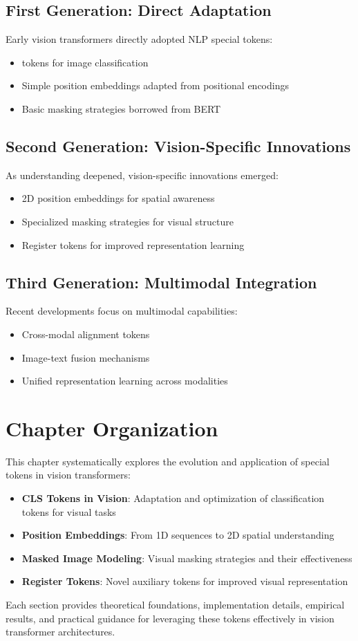 \subsection{First Generation: Direct Adaptation}
Early vision transformers directly adopted NLP special tokens:
\begin{itemize}
\item \cls{} tokens for image classification
\item Simple position embeddings adapted from positional encodings
\item Basic masking strategies borrowed from BERT
\end{itemize}

\subsection{Second Generation: Vision-Specific Innovations}
As understanding deepened, vision-specific innovations emerged:
\begin{itemize}
\item 2D position embeddings for spatial awareness
\item Specialized masking strategies for visual structure
\item Register tokens for improved representation learning
\end{itemize}

\subsection{Third Generation: Multimodal Integration}
Recent developments focus on multimodal capabilities:
\begin{itemize}
\item Cross-modal alignment tokens
\item Image-text fusion mechanisms
\item Unified representation learning across modalities
\end{itemize}

\section{Chapter Organization}

This chapter systematically explores the evolution and application of special tokens in vision transformers:

\begin{itemize}
\item \textbf{CLS Tokens in Vision}: Adaptation and optimization of classification tokens for visual tasks
\item \textbf{Position Embeddings}: From 1D sequences to 2D spatial understanding
\item \textbf{Masked Image Modeling}: Visual masking strategies and their effectiveness
\item \textbf{Register Tokens}: Novel auxiliary tokens for improved visual representation
\end{itemize}

Each section provides theoretical foundations, implementation details, empirical results, and practical guidance for leveraging these tokens effectively in vision transformer architectures.